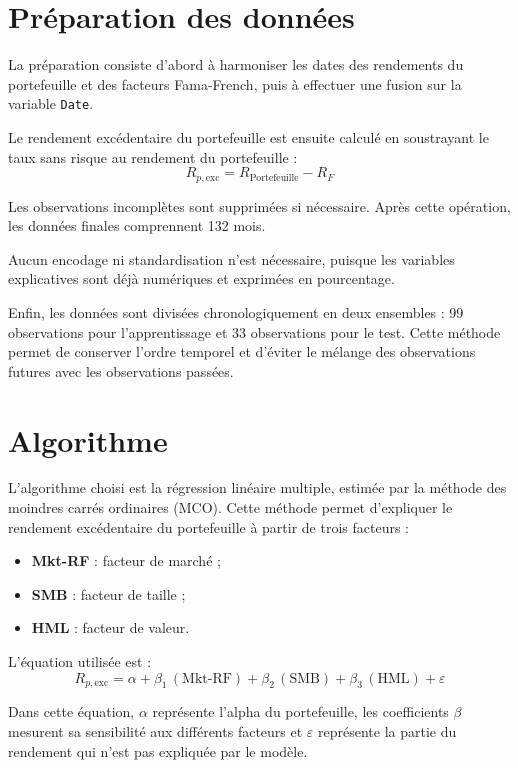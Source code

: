 \documentclass[12pt,a4paper]{article}
\begin{document}
\section{Préparation des données}

La préparation consiste d'abord à harmoniser les dates des rendements du portefeuille et des facteurs Fama-French, puis à effectuer une fusion sur la variable \texttt{Date}.

Le rendement excédentaire du portefeuille est ensuite calculé en soustrayant le taux sans risque au rendement du portefeuille :
\[
R_{p,\mathrm{exc}} = R_{\mathrm{Portefeuille}} - R_F
\]

Les observations incomplètes sont supprimées si nécessaire. Après cette opération, les données finales comprennent 132 mois.

Aucun encodage ni standardisation n'est nécessaire, puisque les variables explicatives sont déjà numériques et exprimées en pourcentage.

Enfin, les données sont divisées chronologiquement en deux ensembles : 99 observations pour l'apprentissage et 33 observations pour le test. Cette méthode permet de conserver l'ordre temporel et d'éviter le mélange des observations futures avec les observations passées.

\section{Algorithme}

L'algorithme choisi est la régression linéaire multiple, estimée par la méthode des moindres carrés ordinaires (MCO). Cette méthode permet d'expliquer le rendement excédentaire du portefeuille à partir de trois facteurs :
\begin{itemize}
    \item \textbf{Mkt-RF} : facteur de marché ;
    \item \textbf{SMB} : facteur de taille ;
    \item \textbf{HML} : facteur de valeur.
\end{itemize}

L'équation utilisée est :
\[
R_{p,\mathrm{exc}} = \alpha + \beta_1\,(\text{Mkt-RF}) + \beta_2\,(\text{SMB}) + \beta_3\,(\text{HML}) + \varepsilon
\]

Dans cette équation, $\alpha$ représente l'alpha du portefeuille, les coefficients $\beta$ mesurent sa sensibilité aux différents facteurs et $\varepsilon$ représente la partie du rendement qui n'est pas expliquée par le modèle.
\end{document}
